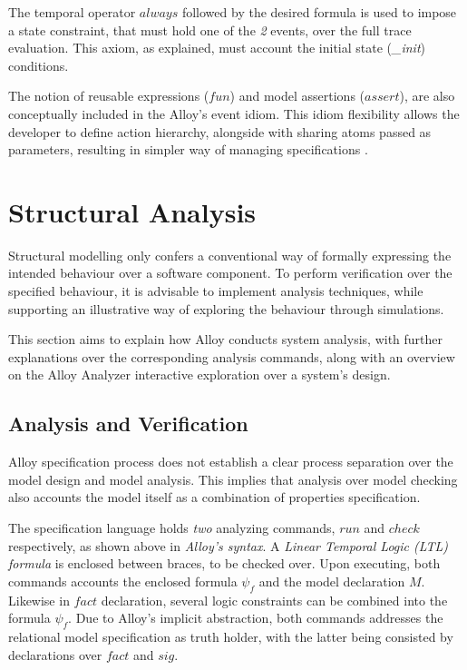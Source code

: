 The temporal operator $always$ followed by the desired formula is used to impose a state constraint, that must hold one of the \textit{2} events, over the full trace evaluation. This axiom, as explained, must account the initial state (\textit{\_init}) conditions.

The notion of reusable expressions ($fun$) and model assertions ($assert$), are also conceptually included in the Alloy's event idiom. This idiom flexibility allows the developer to define action hierarchy, alongside with sharing atoms passed as parameters, resulting in simpler way of managing specifications \cite{lwspecification, alloy-docs}.


\section{Structural Analysis}

Structural modelling only confers a conventional way of formally expressing the intended behaviour over a software component. To perform verification over the specified behaviour, it is advisable to implement analysis techniques, while supporting an illustrative way of exploring the behaviour through simulations. 

This section aims to explain how Alloy conducts system analysis, with further explanations over the corresponding analysis commands, along with an overview on the Alloy Analyzer interactive exploration over a system's design. 

\subsection{Analysis and Verification}

Alloy specification process does not establish a clear process separation over the model design and model analysis. This implies that analysis over model checking also accounts the model itself as a combination of properties specification. 

The specification language holds \textit{two} analyzing commands, $run$ and $check$ respectively, as shown above in \textit{Alloy's syntax}. A \textit{Linear Temporal Logic (LTL) formula} is enclosed between braces, to be checked over. Upon executing, both commands accounts the enclosed formula $\psi_{f}$ and the model declaration ${M}$. Likewise in $fact$ declaration, several logic constraints can be combined into the formula $\psi_{f}$. Due to Alloy's implicit abstraction, both commands addresses the relational model specification as truth holder, with the latter being consisted by declarations over $fact$ and $sig$. 

